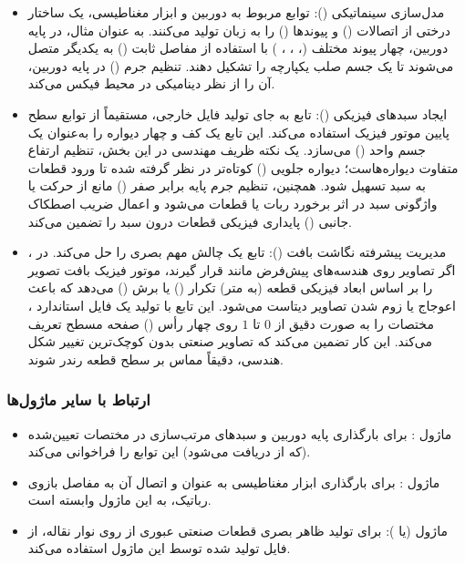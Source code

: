 \documentclass{article}
\begin{document}
\begin{itemize}
	\item مدل‌سازی سینماتیکی (): توابع مربوط به دوربین و ابزار مغناطیسی، یک ساختار درختی از اتصالات () و پیوندها () را به زبان  تولید می‌کنند. به عنوان مثال، در پایه دوربین، چهار پیوند مختلف (، ، ، ) با استفاده از مفاصل ثابت () به یکدیگر متصل می‌شوند تا یک جسم صلب یکپارچه را تشکیل دهند. تنظیم جرم () در پایه دوربین، آن را از نظر دینامیکی در محیط فیکس می‌کند.
	
	\item ایجاد سبدهای فیزیکی (): تابع  به جای تولید فایل خارجی، مستقیماً از توابع سطح پایین موتور فیزیک استفاده می‌کند. این تابع یک کف و چهار دیواره را به‌عنوان یک جسم واحد () می‌سازد. یک نکته ظریف مهندسی در این بخش، تنظیم ارتفاع متفاوت دیواره‌هاست؛ دیواره جلویی () کوتاه‌تر در نظر گرفته شده تا ورود قطعات به سبد تسهیل شود. همچنین، تنظیم جرم پایه برابر صفر () مانع از حرکت یا واژگونی سبد در اثر برخورد ربات یا قطعات می‌شود و اعمال ضریب اصطکاک جانبی () پایداری فیزیکی قطعات درون سبد را تضمین می‌کند.
	
	\item مدیریت پیشرفته نگاشت بافت (): تابع  یک چالش مهم بصری را حل می‌کند. در ، اگر تصاویر روی هندسه‌های پیش‌فرض مانند  قرار گیرند، موتور فیزیک بافت تصویر را بر اساس ابعاد فیزیکی قطعه (به متر) تکرار () یا برش () می‌دهد که باعث اعوجاج یا زوم شدن تصاویر دیتاست می‌شود. این تابع با تولید یک فایل استاندارد ، مختصات  را به صورت دقیق از $0$ تا $1$ روی چهار رأس () صفحه مسطح تعریف می‌کند. این کار تضمین می‌کند که تصاویر صنعتی بدون کوچک‌ترین تغییر شکل هندسی، دقیقاً مماس بر سطح قطعه رندر شوند.
\end{itemize}

\subsubsection{ارتباط با سایر ماژول‌ها}
\begin{itemize}
	\item ماژول : برای بارگذاری پایه دوربین و سبدهای مرتب‌سازی در مختصات تعیین‌شده (که از  دریافت می‌شود) این توابع را فراخوانی می‌کند.
	\item ماژول : برای بارگذاری ابزار مغناطیسی به عنوان  و اتصال آن به مفاصل بازوی رباتیک، به این ماژول وابسته است.
	\item ماژول  (یا ): برای تولید ظاهر بصری قطعات صنعتی عبوری از روی نوار نقاله، از فایل  تولید شده توسط این ماژول استفاده می‌کند.
\end{itemize}
\end{document}
